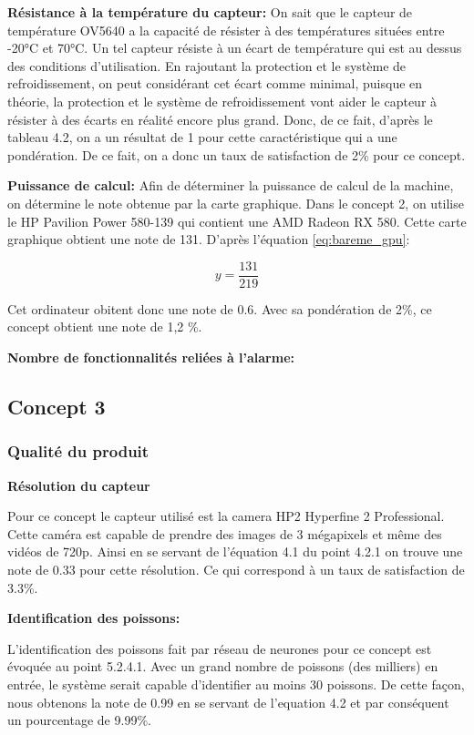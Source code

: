 \textbf{Résistance à la température du capteur:}
On sait que le capteur de température OV5640 a la capacité de résister à des températures situées entre -20°C et 70°C. Un tel capteur résiste à un écart de température qui est au dessus des conditions d'utilisation. En rajoutant la protection et le système de refroidissement, on peut considérant cet écart comme minimal, puisque en théorie, la protection et le système de refroidissement vont aider le capteur à résister à des écarts en réalité encore plus grand. Donc, de ce fait, d'après le tableau 4.2, on a un résultat de 1 pour cette caractéristique qui a une pondération. De ce fait, on a donc un taux de satisfaction de 2\% pour ce concept.  

\textbf{Puissance de calcul:}
Afin de déterminer la puissance de calcul de la machine, on détermine le note obtenue par la carte graphique. Dans le concept 2, on utilise le HP Pavilion Power 580-139 qui contient une AMD Radeon RX 580. Cette carte graphique obtient une note de 131. D'après l'équation \ref{eq:bareme_gpu}:

\begin{equation}
    y = \frac{131}{219}
\end{equation}

Cet ordinateur obitent donc une note de 0.6. Avec sa pondération de 2\%, ce concept obtient une note de 1,2 \%.

\textbf{Nombre de fonctionnalités reliées à l'alarme:}


\subsection{Concept 3}

\subsubsection{Qualité du produit}

\textbf{Résolution du capteur}

     Pour ce concept le capteur utilisé est la camera HP2 Hyperfine 2 Professional. Cette caméra est capable de prendre des images de 3 mégapixels et même des vidéos de 720p. Ainsi en se servant de l’équation 4.1 du point 4.2.1 on trouve une note de 0.33 pour cette résolution. Ce qui correspond à un taux de satisfaction de 3.3\%.

\textbf{Identification des poissons:}

L’identification des poissons fait par réseau de neurones pour ce concept est évoquée au point 5.2.4.1. Avec un grand nombre de poissons (des milliers) en entrée, le système serait capable d’identifier au moins 30 poissons. De cette façon, nous obtenons la note de 0.99 en se servant de l’equation 4.2 et par conséquent un pourcentage de 9.99\%.

